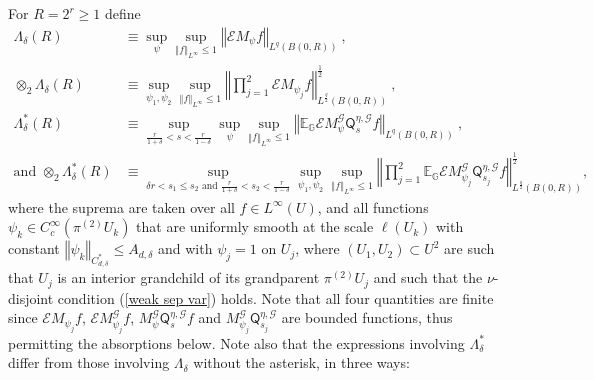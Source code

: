 \documentclass{amsart}%
\theoremstyle{plain}
\numberwithin{equation}{section}
\begin{document}
For $R=2^{r}\geq1$ define%
\begin{align}
\Lambda_{\delta}\left(  R\right)   & \equiv\sup_{\psi}\sup_{\left\Vert
f\right\Vert _{L^{\infty}}\leq1}\left\Vert \mathcal{E}M_{\psi}f\right\Vert
_{L^{q}\left(  B\left(  0,R\right)  \right)  }\ ,\label{def Lambda}\\
\otimes_{2}\Lambda_{\delta}\left(  R\right)   & \equiv\sup_{\psi_{1},\psi_{2}%
}\sup_{\left\Vert f\right\Vert _{L^{\infty}}\leq1}\left\Vert \prod_{j=1}%
^{2}\mathcal{E}M_{\psi_{j}}f\right\Vert _{L^{\frac{q}{2}}\left(  B\left(
0,R\right)  \right)  }^{\frac{1}{2}}\ ,\nonumber\\
\Lambda_{\delta}^{\ast}\left(  R\right)   & \equiv\sup_{\frac{r}{1+\delta
}<s<\frac{r}{1-\delta}}\sup_{\psi}\sup_{\left\Vert f\right\Vert _{L^{\infty}%
}\leq1}\left\Vert \mathbb{E}_{\mathbb{G}}\mathcal{E}M_{\psi}^{\mathcal{G}%
}\mathsf{Q}_{s}^{\eta,\mathcal{G}}f\right\Vert _{L^{q}\left(  B\left(
0,R\right)  \right)  }\ ,\nonumber\\
\text{and }\otimes_{2}\Lambda_{\delta}^{\ast}\left(  R\right)   & \equiv
\sup_{\delta r<s_{1}\leq s_{2}\text{ and }\frac{r}{1+\delta}<s_{2}<\frac
{r}{1-\delta}}\sup_{\psi_{1},\psi_{2}}\sup_{\left\Vert f\right\Vert
_{L^{\infty}}\leq1}\left\Vert \prod_{j=1}^{2}\mathbb{E}_{\mathbb{G}%
}\mathcal{E}M_{\psi_{j}}^{\mathcal{G}}\mathsf{Q}_{s_{j}}^{\eta,\mathcal{G}%
}f\right\Vert _{L^{\frac{q}{2}}\left(  B\left(  0,R\right)  \right)  }%
^{\frac{1}{2}},\nonumber
\end{align}
where the suprema are taken over all $f\in L^{\infty}\left(  U\right)  $, and
all functions $\psi_{k}\in C_{c}^{\infty}\left(  \pi^{\left(  2\right)  }%
U_{k}\right)  $ that are uniformly smooth at the scale $\ell\left(
U_{k}\right)  $ with constant $\left\Vert \psi_{k}\right\Vert _{C_{d,\delta
}^{\ast}}\leq A_{d,\delta}$ and with $\psi_{j}=1$ on $U_{j}$, where $\left(
U_{1},U_{2}\right)  \subset U^{2}$ are such that $U_{j}$ is an interior
grandchild of its grandparent $\pi^{\left(  2\right)  }U_{j}$ and such that
the $\nu$-disjoint condition (\ref{weak sep var}) holds. Note that all four
quantities are finite since $\mathcal{E}M_{\psi_{j}}f$, $\mathcal{E}%
M_{\psi_{j}}^{\mathcal{G}}f$, $M_{\psi}^{\mathcal{G}}\mathsf{Q}_{s}%
^{\eta,\mathcal{G}}f$ and $M_{\psi_{j}}^{\mathcal{G}}\mathsf{Q}_{s_{j}}%
^{\eta,\mathcal{G}}$ are bounded functions, thus permitting the absorptions
below. Note also that the expressions involving $\Lambda_{\delta}^{\ast}$
differ from those involving $\Lambda_{\delta}$ without the asterisk, in three ways:
\end{document}
